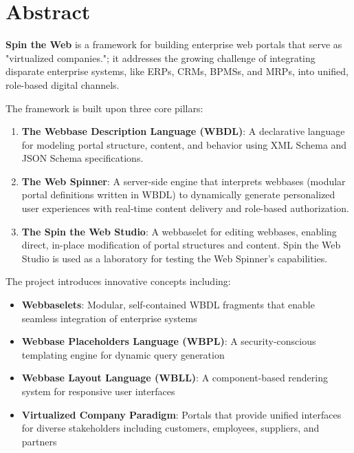 
\chapter*{Abstract}

\textbf{Spin the Web} is a framework for building enterprise web portals that serve as "virtualized companies."; it addresses the growing challenge of integrating disparate enterprise systems, like ERPs, CRMs, BPMSs, and MRPs, into unified, role-based digital channels.

The framework is built upon three core pillars:

\begin{enumerate}
\item \textbf{The Webbase Description Language (WBDL)}: A declarative language for modeling portal structure, content, and behavior using XML Schema and JSON Schema specifications.

\item \textbf{The Web Spinner}: A server-side engine that interprets webbases (modular portal definitions written in WBDL) to dynamically generate personalized user experiences with real-time content delivery and role-based authorization.

\item \textbf{The Spin the Web Studio}: A webbaselet for editing webbases, enabling direct, in-place modification of portal structures and content. Spin the Web Studio is used as a laboratory for testing the Web Spinner's capabilities.
\end{enumerate}

The project introduces innovative concepts including:
\begin{itemize}
\item \textbf{Webbaselets}: Modular, self-contained WBDL fragments that enable seamless integration of enterprise systems
\item \textbf{Webbase Placeholders Language (WBPL)}: A security-conscious templating engine for dynamic query generation
\item \textbf{Webbase Layout Language (WBLL)}: A component-based rendering system for responsive user interfaces
\item \textbf{Virtualized Company Paradigm}: Portals that provide unified interfaces for diverse stakeholders including customers, employees, suppliers, and partners
\end{itemize}

